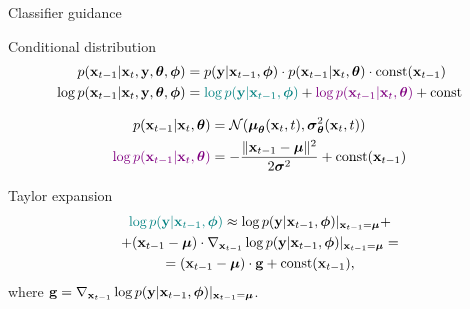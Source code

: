 \begin{frame}{Classifier guidance}
	\begin{block}{Conditional distribution}
		\vspace{-0.5cm}
		\begin{align*}
			p(\mathbf{x}_{t - 1} | \mathbf{x}_t, \mathbf{y}, \boldsymbol{\theta} , \boldsymbol{\phi}) &= p(\mathbf{y} | \mathbf{x}_{t-1}, \boldsymbol{\phi}) \cdot p(\mathbf{x}_{t-1} | \mathbf{x}_t, \boldsymbol{\theta}) \cdot \text{const}(\mathbf{x}_{t - 1}) \\
			\log p(\mathbf{x}_{t - 1} | \mathbf{x}_t, \mathbf{y}, \boldsymbol{\theta} , \boldsymbol{\phi}) &= {\color{teal}\log p(\mathbf{y} | \mathbf{x}_{t-1}, \boldsymbol{\phi})} + {\color{violet}\log p(\mathbf{x}_{t-1} | \mathbf{x}_t, \boldsymbol{\theta})} + \text{const}
		\end{align*}
	\end{block}
	\vspace{-0.7cm}
	\begin{align*}
		p(\mathbf{x}_{t-1} | \mathbf{x}_t, \boldsymbol{\theta}) &= \mathcal{N}(\boldsymbol{\mu}_{\boldsymbol{\theta}}(\mathbf{x}_t, t), \boldsymbol{\sigma}^2_{\boldsymbol{\theta}}(\mathbf{x}_t, t)) \\
		{\color{violet}\log p(\mathbf{x}_{t-1} | \mathbf{x}_t, \boldsymbol{\theta})} &= - \frac{\|\mathbf{x}_{t - 1} - \boldsymbol{\mu}\|^2}{2 \boldsymbol{\sigma}^2} + \text{const}(\mathbf{x}_{t-1})
	\end{align*}
	\vspace{-0.5cm}
	\begin{block}{Taylor expansion}
		\vspace{-0.7cm}
		\begin{multline*}
			{\color{teal}\log p(\mathbf{y}| \mathbf{x}_{t-1}, \boldsymbol{\phi})} \approx \log p(\mathbf{y} | \mathbf{x}_{t-1}, \boldsymbol{\phi}) |_{\mathbf{x}_{t-1} = \boldsymbol{\mu}} + \\
			+ (\mathbf{x}_{t-1} - \boldsymbol{\mu}) \cdot \nabla_{\mathbf{x}_{t-1}} \log p(\mathbf{y} | \mathbf{x}_{t-1}, \boldsymbol{\phi}) |_{\mathbf{x}_{t-1} = \boldsymbol{\mu}} = \\
			= (\mathbf{x}_{t-1} - \boldsymbol{\mu}) \cdot \mathbf{g} +  \text{const}(\mathbf{x}_{t-1}),
		\end{multline*}
		where $\mathbf{g} =  \nabla_{\mathbf{x}_{t-1}} \log p(\mathbf{y} | \mathbf{x}_{t-1}, \boldsymbol{\phi}) |_{\mathbf{x}_{t-1} = \boldsymbol{\mu}}$.
	\end{block}
\end{frame}
